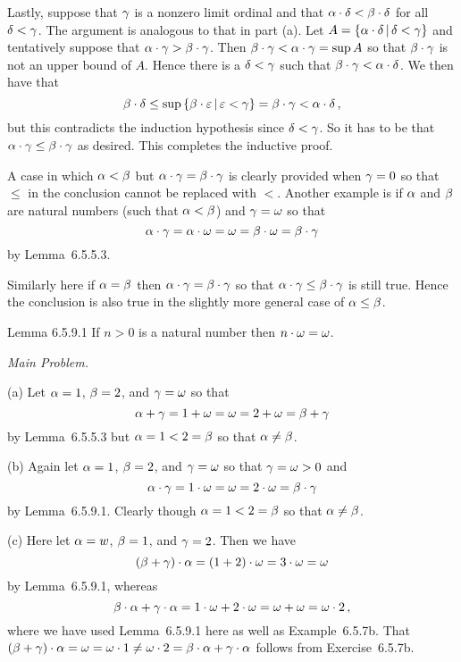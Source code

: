 \begin{solution}
    Lastly, suppose that $\gamma$ is a nonzero limit ordinal and that $\alpha \cdot \delta < \beta \cdot \delta$ for all $\delta < \gamma$.
    The argument is analogous to that in part (a).
    Let $A = \left\{ \alpha \cdot \delta \,|\, \delta < \gamma \right\}$ and tentatively suppose that $\alpha \cdot \gamma > \beta \cdot \gamma$.
    Then $\beta \cdot \gamma < \alpha \cdot \gamma = \sup{A}$ so that $\beta \cdot \gamma$ is not an upper bound of $A$.
    Hence there is a $\delta < \gamma$ such that $\beta \cdot \gamma < \alpha \cdot \delta$.
    We then have that
    $$
    \beta \cdot \delta \leq \sup\left\{ \beta \cdot \varepsilon \,|\, \varepsilon < \gamma \right\} = \beta \cdot \gamma < \alpha \cdot \delta \,,
    $$
    but this contradicts the induction hypothesis since $\delta < \gamma$.
    So it has to be that $\alpha \cdot \gamma \leq \beta \cdot \gamma$ as desired.
    This completes the inductive proof.

    A case in which $\alpha < \beta$ but $\alpha \cdot \gamma = \beta \cdot \gamma$ is clearly provided when $\gamma = 0$ so that $\leq$ in the conclusion cannot be replaced with $<$. Another example is if $\alpha$ and $\beta$ are natural numbers (such that $\alpha < \beta$) and $\gamma = \omega$ so that
    $$
    \alpha \cdot \gamma = \alpha \cdot \omega = \omega = \beta \cdot \omega = \beta \cdot \gamma
    $$
    by Lemma~6.5.5.3.

    Similarly here if $\alpha = \beta$ then $\alpha \cdot \gamma = \beta \cdot \gamma$ so that $\alpha \cdot \gamma \leq \beta \cdot \gamma$ is still true.
    Hence the conclusion is also true in the slightly more general case of $\alpha \leq \beta$. \qedsymbol
\end{solution}


\begin{solution}
    \begin{statement}{Lemma 6.5.9.1}
        If $n > 0$ is a natural number then $n \cdot \omega = \omega$.
    \end{statement}


    \emph{Main Problem.}

	(a) Let $\alpha = 1$, $\beta = 2$, and $\gamma = \omega$ so that
    $$
    \alpha + \gamma = 1 + \omega = \omega = 2 + \omega = \beta + \gamma
    $$
    by Lemma~6.5.5.3 but $\alpha = 1 < 2 = \beta$ so that $\alpha \neq \beta$.

    (b) Again let $\alpha = 1$, $\beta = 2$, and $\gamma = \omega$ so that $\gamma = \omega > 0$ and
    $$
    \alpha \cdot \gamma = 1 \cdot \omega = \omega = 2 \cdot \omega = \beta \cdot \gamma
    $$
    by Lemma~6.5.9.1.
    Clearly though $\alpha = 1 < 2 = \beta$ so that $\alpha \neq \beta$.

    (c) Here let $\alpha = w$, $\beta = 1$, and $\gamma = 2$.
    Then we have
    $$
    (\beta + \gamma) \cdot \alpha = (1 + 2) \cdot \omega = 3 \cdot \omega = \omega
    $$
    by Lemma~6.5.9.1, whereas
    $$
    \beta \cdot \alpha + \gamma \cdot \alpha = 1 \cdot \omega + 2 \cdot \omega = \omega + \omega = \omega \cdot 2 \,,
    $$
    where we have used Lemma~6.5.9.1 here as well as Example~6.5.7b.
    That $(\beta + \gamma) \cdot \alpha = \omega = \omega \cdot 1 \neq \omega \cdot 2 = \beta \cdot \alpha + \gamma \cdot \alpha$ follows from Exercise~6.5.7b.
\end{solution}


